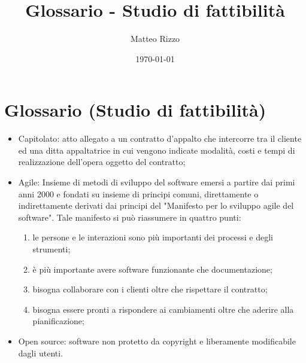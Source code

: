 \documentclass[openany,12pt,a4paper]{report}
\title{Glossario - Studio di fattibilità}
\author{Matteo Rizzo}
\date{\today}
\begin{document}
\chapter{Glossario (Studio di fattibilità)}

\begin{itemize}
    \item{Capitolato}: atto allegato a un contratto d'appalto che intercorre tra il cliente ed una ditta appaltatrice in cui vengono indicate modalità, costi e tempi di realizzazione dell'opera oggetto del contratto;
    
    \item{Agile}: Insieme di metodi di sviluppo del software emersi a partire dai
    primi anni 2000 e fondati su insieme di principi comuni, direttamente o
    indirettamente derivati dai principi del "Manifesto per lo sviluppo agile del
    software". Tale manifesto si può riassumere in quattro punti:
    \begin{enumerate}
        \item le persone e le interazioni sono più importanti dei processi e degli strumenti;
        \item è più importante avere software funzionante che documentazione;
        \item bisogna collaborare con i clienti oltre che rispettare il contratto;
        \item bisogna essere pronti a rispondere ai cambiamenti oltre che aderire alla pianificazione;
    \end{enumerate}
    
    \item{Open source}: software non protetto da copyright e liberamente modificabile dagli utenti.
\end{itemize}
\end{document}
